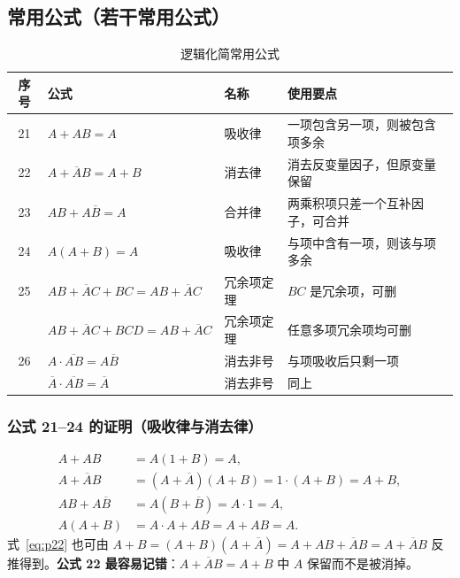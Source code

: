 \subsection{常用公式（若干常用公式）}
\begin{table}[!htbp]
    \centering
    \caption{逻辑化简常用公式}
    \label{tab:common_formula}
    \begin{tabular}{@{}clll@{}}
        \toprule
        序号 & 公式 & 名称 & 使用要点 \\
        \midrule
        21 & $A+AB=A$ & 吸收律 & 一项包含另一项，则被包含项多余 \\
        22 & $A+\overline{A}B=A+B$ & 消去律 & 消去反变量因子，但原变量保留 \\
        23 & $AB+A\overline{B}=A$ & 合并律 & 两乘积项只差一个互补因子，可合并 \\
        24 & $A(A+B)=A$ & 吸收律 & 与项中含有一项，则该与项多余 \\
        25 & $AB+\overline{A}C+BC=AB+\overline{A}C$ & 冗余项定理 & $BC$ 是冗余项，可删 \\
           & $AB+\overline{A}C+BCD=AB+\overline{A}C$ & 冗余项定理 & 任意多项冗余项均可删 \\
        26 & $A\cdot\overline{AB}=A\overline{B}$ & 消去非号 & 与项吸收后只剩一项 \\
           & $\overline{A}\cdot\overline{AB}=\overline{A}$ & 消去非号 & 同上 \\
        \bottomrule
    \end{tabular}
\end{table}

\subsubsection{公式 21--24 的证明（吸收律与消去律）}
\begin{align}
A+AB &= A(1+B)=A, \label{eq:p21}\\
A+\overline{A}B &= (A+\overline{A})(A+B)=1\cdot(A+B)=A+B, \label{eq:p22}\\
AB+A\overline{B} &= A(B+\overline{B})=A\cdot 1=A, \label{eq:p23}\\
A(A+B) &= A\cdot A+AB=A+AB=A. \label{eq:p24}
\end{align}
式~\eqref{eq:p22} 也可由 $A+B=(A+B)(A+\overline{A})=A+AB+\overline{A}B=A+\overline{A}B$ 反推得到。\textbf{公式 22 最容易记错}：$A+\overline{A}B=A+B$ 中 $A$ 保留而不是被消掉。

